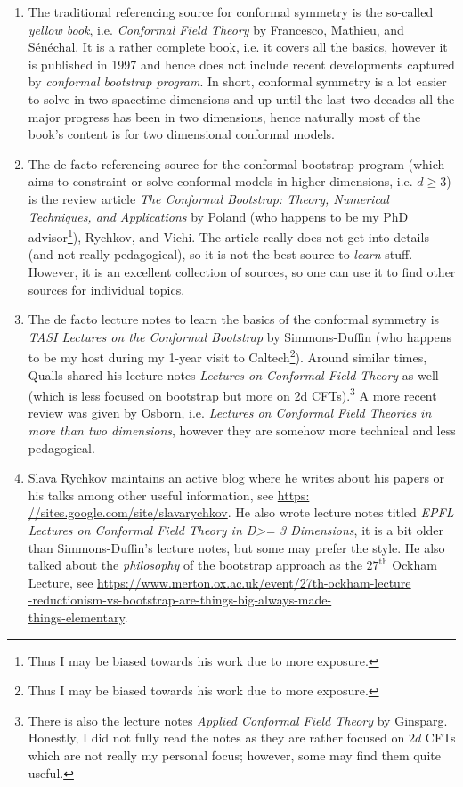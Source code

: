 \begin{enumerate}
	\item The traditional referencing source for conformal symmetry is the so-called \emph{yellow book}, i.e. \emph{Conformal Field Theory} by Francesco, Mathieu, and Sénéchal. It is a rather complete book, i.e. it covers all the basics, however it is published in 1997 and hence does not include recent developments captured by \emph{conformal bootstrap program}. In short, conformal symmetry is a lot easier to solve in two spacetime dimensions and up until the last two decades all the major progress has been in two dimensions, hence naturally most of the book's content is for two dimensional conformal models.
	\item The de facto referencing source for the conformal bootstrap program (which aims to constraint or solve conformal models in higher dimensions, i.e. $d\ge 3$) is the review article \emph{The Conformal Bootstrap: Theory, Numerical Techniques, and Applications} by Poland (who happens to be my PhD advisor\footnote{Thus I may be biased towards his work due to more exposure.}), Rychkov, and Vichi. The article really does not get into details (and not really pedagogical), so it is not the best source to \emph{learn} stuff. However, it is an excellent collection of sources, so one can use it to find other sources for individual topics.
	\item The de facto lecture notes to learn the basics of the conformal symmetry is \emph{TASI Lectures on the Conformal Bootstrap} by Simmons-Duffin (who happens to be my host during my 1-year visit to Caltech\footnote{Thus I may be biased towards his work due to more exposure.}). Around similar times, Qualls shared his lecture notes \emph{Lectures on Conformal Field Theory} as well (which is less focused on bootstrap but more on 2d CFTs).\footnote{There is also the lecture notes \emph{Applied Conformal Field Theory} by Ginsparg. Honestly, I did not fully read the notes as they are rather focused on $2d$ CFTs which are not really my personal focus; however, some may find them quite useful.} A more recent review was given by Osborn, i.e. \emph{Lectures on Conformal Field Theories in more than two dimensions}, however they are somehow more technical and less pedagogical.
	\item Slava Rychkov maintains an active blog where he writes about his papers or his talks among other useful information, see \hyperref{https://sites.google.com/site/slavarychkov}{}{}{https: //sites.google.com/site/slavarychkov}. He also wrote lecture notes titled \emph{EPFL Lectures on Conformal Field Theory in D>= 3 Dimensions}, it is a bit older than Simmons-Duffin's lecture notes, but some may prefer the style. He also talked about the \emph{philosophy} of the bootstrap approach as the $27^{\text{th}}$ Ockham Lecture, see \hyperref{https://www.merton.ox.ac.uk/event/27th-ockham-lecture-reductionism-vs-bootstrap-are-things-big-always-made-things-elementary}{}{}{https://www.merton.ox.ac.uk/event/27th-ockham-lecture\\-reductionism-vs-bootstrap-are-things-big-always-made-\\things-elementary}.
	

\end{enumerate}
